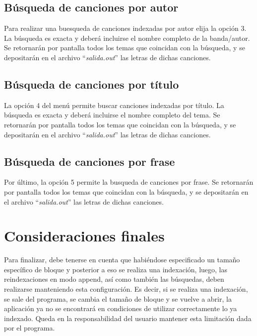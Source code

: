 \documentclass{article}
\begin{document}
\subsection{Búsqueda de canciones por autor}

	Para realizar una buesqueda de canciones indexadas por autor elija la opción 3. La búsqueda es exacta y deberá incluirse el nombre completo de la banda/autor. Se retornarán por pantalla todos los temas que coincidan con la búsqueda, y se depositarán en el archivo ``\textit{salida.out}'' las letras de dichas canciones.
\bigskip



\subsection{Búsqueda de canciones por título}

	La opción 4 del menú permite buscar canciones indexadas por título. La búsqueda es exacta y deberá incluirse el nombre completo del tema. Se retornarán por pantalla todos los temas que coincidan con la búsqueda, y se depositarán en el archivo ``\textit{salida.out}'' las letras de dichas canciones.
\bigskip



\subsection{Búsqueda de canciones por frase}

	Por último, la opción 5 permite la busqueda de canciones por frase. Se retornarán por pantalla todos los temas que coincidan con la búsqueda, y se depositarán en el archivo ``\textit{salida.out}'' las letras de dichas canciones.
\bigskip\bigskip



\section{Consideraciones finales}

	Para finalizar, debe tenerse en cuenta que habiéndose especificado un tamaño específico de bloque y posterior a eso se realiza una indexación, luego, las reindexaciones en modo append, así como también las búsquedas, deben realizarse manteniendo esta configuración. Es decir, si se realiza una indexación, se sale del programa, se cambia el tamaño de bloque y se vuelve a abrir, la aplicación ya no se encontrará en condiciones de utilizar correctamente lo ya indexado. Queda en la responsabilidad del usuario mantener esta limitación dada por el programa.
\bigskip
\end{document}
